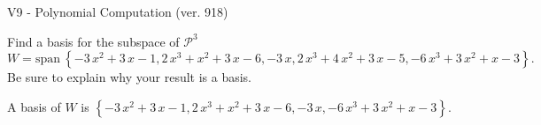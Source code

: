 \begin{exercise}
  \begin{exerciseTitle}V9 - Polynomial Computation (ver. 918)\end{exerciseTitle}
  \begin{exerciseStatement}
    Find a basis for the subspace of \(\mathcal{P}^3\) 
\[W=\mathrm{span}\ \left\{-3 \, x^{2} + 3 \, x - 1 , 2 \, x^{3} + x^{2} + 3 \, x - 6 , -3 \, x , 2 \, x^{3} + 4 \, x^{2} + 3 \, x - 5 , -6 \, x^{3} + 3 \, x^{2} + x - 3\right\}.\]
 Be sure to explain why your result is a basis.


  \end{exerciseStatement}
  \begin{exerciseAnswer}
   A basis of \(W\) is  \(\left\{-3 \, x^{2} + 3 \, x - 1 , 2 \, x^{3} + x^{2} + 3 \, x - 6 , -3 \, x , -6 \, x^{3} + 3 \, x^{2} + x - 3\right\}\).
  


  \end{exerciseAnswer}
\end{exercise}
